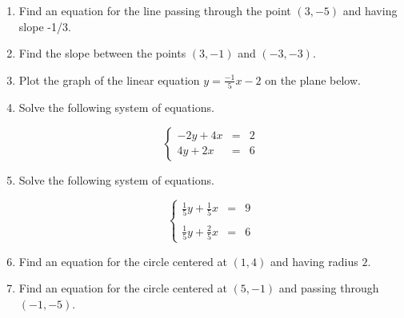 \documentclass{article}
\begin{document}
\ActivityTitle[class={College Algebra}, number={1}, name={Lines and Circles}]

\begin{enumerate}
\item Find an equation for the line passing through the point $(3, -5)$ and having slope -1/3. \vspace{5cm}

\item Find the slope between the points $(3, -1)$ and $(-3, -3)$. \vspace{5cm}

\item Plot the graph of the linear equation $y = \frac{-1}{5} x - 2$ on the plane below.\begin{center}
\CartesianPlane[h=7,w=7,axes=yes]
\end{center}

  

\newpage

\item Solve the following system of equations.

\[ \left\{ \begin{array}{rcl} -2y + 4x & = & 2 \\ 4y + 2x & = & 6 \end{array} \right. \] \vspace{5cm}

\item Solve the following system of equations.

\[ \left\{ \begin{array}{rcl} \frac{1}{5}y + \frac{1}{5}x & = & 9 \\ & & \\ \frac{1}{5}y + \frac{2}{5}x & = & 6 \end{array} \right. \] \vspace{5cm}

\item Find an equation for the circle centered at $(1, 4)$ and having radius $2$. \vspace{2cm}

\item Find an equation for the circle centered at $(5, -1)$ and passing through $(-1, -5)$. \vspace{5cm}
\end{enumerate}
\end{document}
